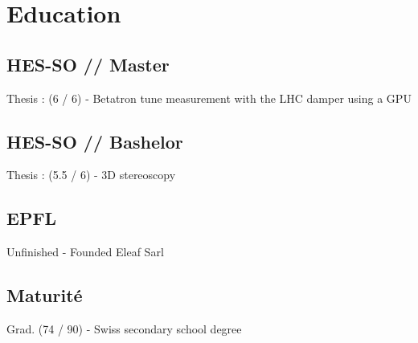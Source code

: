 \documentclass[a4paper]{deedy-resume} %
\begin{document}
\begin{minipage}[t]{0.33\textwidth} %


\section{Education}


\subsection{HES-SO // Master}
	Thesis : (6 / 6) - Betatron tune measurement with the LHC damper using a GPU \\

\sectionspace %


\subsection{HES-SO // Bashelor}
	Thesis : (5.5 / 6) - 3D stereoscopy \\

\sectionspace %


\subsection{EPFL}
	Unfinished - Founded Eleaf Sarl \\

\sectionspace


\subsection{Maturité}
	Grad. (74 / 90) - Swiss secondary school degree \\


\end{minipage}
\end{document}
